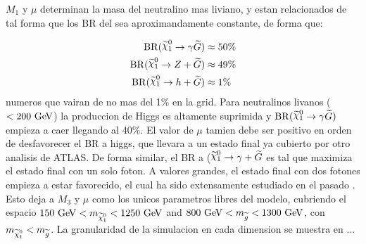 $M_1$ y $\mu$ determinan la masa del neutralino mas liviano, y estan relacionados de tal forma que los BR del {\ninoone} sea aproximandamente constante,
de forma que:

\begin{align}
  \mathrm{BR}(\ninoone \to \gam \gravino) &\approx 50\% \\
  \mathrm{BR}(\ninoone \to Z + \gravino) &\approx 49\% \\
  \mathrm{BR}(\ninoone \to h + \gravino) &\approx 1\%
\end{align}
%
numeros que vairan de no mas del 1\% en la grid. Para neutralinos livanos ($<200\gev$) la produccion de Higgs es
altamente suprimida y $\mathrm{BR}(\ninoone \to \gam \gravino)$ empieza a caer llegando al 40\%. El valor de $\mu$
tamien debe ser positivo en orden de desfavorecer el BR a higgs, que llevara a un estado final ya cubierto por otro analisis
de ATLAS. De forma similar, el BR a ($\ninoone \to \gam + \gravino$ es tal que maximiza el estado final con un solo foton. A valores
grandes, el estado final con dos fotones empieza a estar favorecido, el cual ha sido extensamente estudiado en el pasado \cite{Aad2012519,Aad:2011kz}.
Esto deja a $M_3$ y $\mu$ como los unicos parametros libres del modelo, cubriendo el espacio
$150\gev < m_{\ninoone} < 1250 \gev$ and $800\gev < m_{\gluino} < 1300 \gev$, con $m_{\ninoone} < m_{\gluino}$. La granularidad
de la simulacion en cada dimension se muestra en ...


